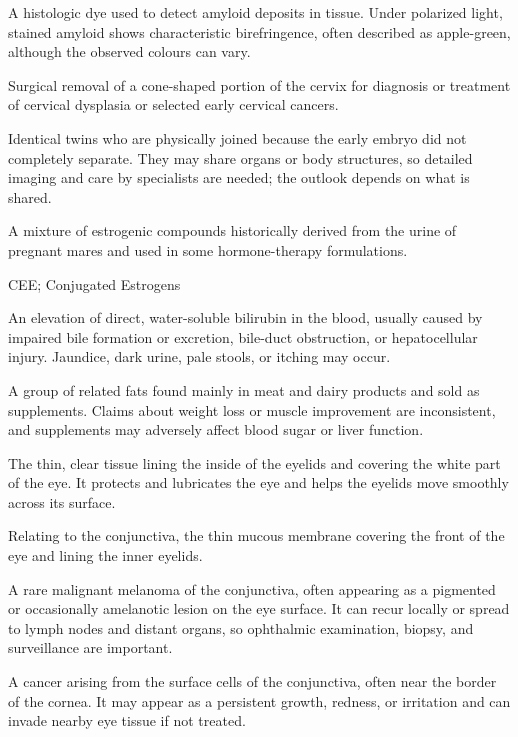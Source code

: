  A histologic dye used to detect amyloid deposits in tissue. Under polarized light, stained amyloid shows characteristic birefringence, often described as apple-green, although the observed colours can vary.

 Surgical removal of a cone-shaped portion of the cervix for diagnosis or treatment of
cervical dysplasia or selected early cervical cancers.

 Identical twins who are physically joined because the early embryo did not completely separate. They may share organs or body structures, so detailed imaging and care by specialists are needed; the outlook depends on what is shared.

 A mixture of estrogenic compounds historically derived from the urine of pregnant mares and used in some hormone-therapy formulations.

\synonyms
CEE; Conjugated Estrogens

 An elevation of direct, water-soluble bilirubin in the blood, usually caused by impaired bile formation or excretion, bile-duct obstruction, or hepatocellular injury. Jaundice, dark urine, pale stools, or itching may occur.

 A group of related fats found mainly in meat and dairy products and sold as supplements. Claims about weight loss or muscle improvement are inconsistent, and supplements may adversely affect blood sugar or liver function.

 The thin, clear tissue lining the inside of the eyelids and covering the white part of the eye. It protects and lubricates the eye and helps the eyelids move smoothly across its surface.

 Relating to the conjunctiva, the thin mucous membrane covering the front of the eye and lining the inner eyelids.

 A rare malignant melanoma of the conjunctiva, often appearing as a pigmented or occasionally amelanotic lesion on the eye surface. It can recur locally or spread to lymph nodes and distant organs, so ophthalmic examination, biopsy, and surveillance are important.

 A cancer arising from the surface cells of the conjunctiva, often near the border of the cornea. It may appear as a persistent growth, redness, or irritation and can invade nearby eye tissue if not treated.

